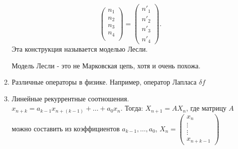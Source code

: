 \begin{examples}
\begin{enumerate}
\[\begin{pmatrix}
                n_1\\
                n_2\\
                n_3\\
                n_4\\
            \end{pmatrix}
             =
             \begin{pmatrix}
                 n'_1\\
                 n'_2\\
                 n'_3\\
                 n'_4
             \end{pmatrix}
            .\] 
            Эта конструкция называется моделью Лесли.
            \begin{remark}
                Модель Лесли - это не Марковская цепь, хотя и очень похожа.
            \end{remark}
        \item
            Различные операторы в физике. Например, оператор Лапласа $\delta f$
        \item
            Линейные рекуррентные соотношения.\\
            $x_{n + k} = a_{k-1}x_{n + (k - 1)} + \dots + a_0x_n$.
            Тогда:
            $X_{n + 1} = AX_n$, где матрицу $A$ можно составить из коэффициентов $a_{k - 1}, \dots, a_0$, $X_n = \begin{pmatrix}
                x_n \\ \vdots \\ \vdots \\ x_{n + k - 1}
            \end{pmatrix}$
    \end{enumerate}
\end{examples}
